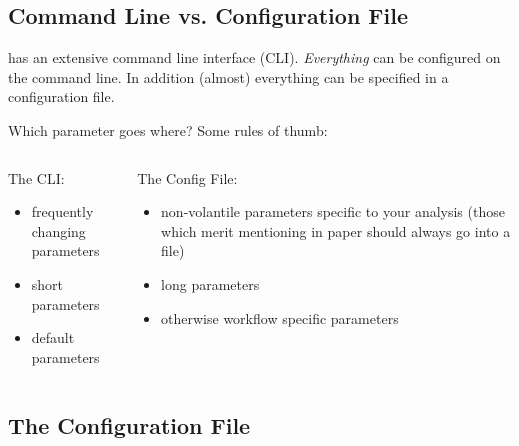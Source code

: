 \subsection{Command Line vs. Configuration File}

\begin{frame}
  \begin{docs}
  	\Snakemake{} has an extensive command line interface (CLI). \emph{Everything} can be configured on the command line. In addition (almost) everything can be specified in a configuration file.
  \end{docs}
  \pause
  \begin{exampleblock}{Which parameter goes where? Some rules of thumb:}
    \begin{columns}[t]
      \begin{column}{0.5\textwidth}
        The CLI:
        \begin{itemize}
         \item frequently changing parameters
         \item short parameters
         \item default parameters
        \end{itemize}
      \end{column}
      \begin{column}{0.5\textwidth}
        The Config File:
        \begin{itemize}
         \item non-volantile parameters specific to your analysis (those which merit mentioning in paper should always go into a file)
         \item long parameters
         \item otherwise workflow specific parameters
        \end{itemize}
      \end{column}
    \end{columns}
  \end{exampleblock}
\end{frame}

\subsection{The Configuration File}

